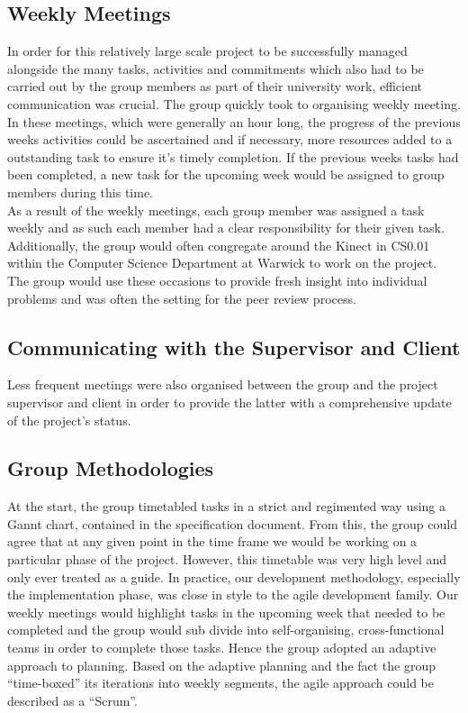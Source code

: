 \subsection{Weekly Meetings}
In order for this relatively large scale project to be successfully managed alongside the many tasks, activities and commitments which also had to be carried out by the group members as part of their university work, efficient communication was crucial. The group quickly took to organising weekly meeting. In these meetings, which were generally an hour long, the progress of the previous weeks activities could be ascertained and if necessary, more resources added to a outstanding task to ensure it's timely completion. If the previous weeks tasks had been completed, a new task for the upcoming week would be assigned to group members during this time. \\

As a result of the weekly meetings, each group member was assigned a task weekly and as such each member had a clear responsibility for their given task. \\

Additionally, the group would often congregate around the Kinect in CS0.01 within the Computer Science Department at Warwick to work on the project. The group would use these occasions to provide fresh insight into individual problems and was often the setting for the peer review process. \\

\subsection{Communicating with the Supervisor and Client}
Less frequent meetings were also organised between the group and the project supervisor and client in order to provide the latter with a comprehensive update of the project's status. \\

\subsection{Group Methodologies}
At the start, the group timetabled tasks in a strict and regimented way using a Gannt chart, contained in the specification document. From this, the group could agree that at any given point in the time frame we would be working on a particular phase of the project. However, this timetable was very high level and only ever treated as a guide. In practice, our development methodology, especially the implementation phase, was close in style to the agile development family. Our weekly meetings would highlight tasks in the upcoming week that needed to be completed and the group would sub divide into self-organising, cross-functional teams in order to complete those tasks. Hence the group adopted an adaptive approach to planning. Based on the adaptive planning and the fact the group “time-boxed” its iterations into weekly segments, the agile approach could be described as a “Scrum”. \\


